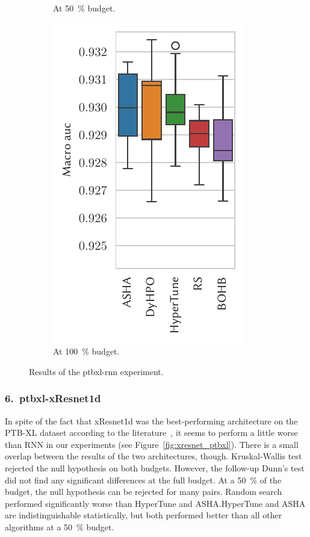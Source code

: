 \begin{figure}[H]
\begin{subfigure}{.26\textwidth}
        \caption{At \SI{50}{\percent} budget.}%
    \end{subfigure}%
    \begin{subfigure}{.26\textwidth}
        \includegraphics[height=\plotheight]{img/real_exp/ptbxl_rnn_boxplot_full.pdf}%
        \caption{At \SI{100}{\percent} budget.}%
    \end{subfigure}%
\caption{Results of the ptbxl-rnn experiment.}
\label{fig:rnn_ptbxl}
\end{figure}


\subsubsection{6.\ ptbxl-xResnet1d}
In spite of the fact that xResnet1d was the best-performing architecture on the PTB-XL dataset according to the literature~\cite{strodthoff2020deep}, it seems to perform a little worse than RNN in our experiments (see Figure~\ref{fig:xresnet_ptbxl}). There is a small overlap between the results of the two architectures, though. Kruskal-Wallis test rejected the null hypothesis on both budgets. However, the follow-up Dunn's test did not find any significant differences at the full budget. At a \SI{50}{\percent} of the budget, the null hypothesis can be rejected for many pairs. Random search performed significantly worse than HyperTune and ASHA.\@ HyperTune and ASHA are indistinguishable statistically, but both performed better than all other algorithms at a \SI{50}{\percent} budget.

